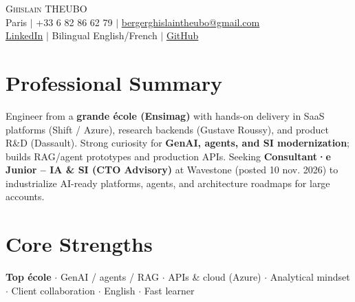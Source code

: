 \documentclass[letterpaper,10.5pt]{article}
\begin{document}
\begin{center}
{\Huge \scshape Ghislain THEUBO} \\ \vspace{2pt}
\small Paris $|$ +33 6 82 86 62 79 $|$ \href{mailto:bergerghislaintheubo@gmail.com}{bergerghislaintheubo@gmail.com} \\
\href{https://www.linkedin.com/in/berger-ghislain}{LinkedIn} $|$ Bilingual English/French $|$ \href{https://github.com/Bergerghislain}{GitHub}
\end{center}
\vspace{-6pt}
\section{Professional Summary}
\small{Engineer from a \textbf{grande \'ecole (Ensimag)} with hands-on delivery in SaaS platforms (Shift / Azure), research backends (Gustave Roussy), and product R\&D (Dassault). Strong curiosity for \textbf{GenAI, agents, and SI modernization}; builds RAG/agent prototypes and production APIs. Seeking \textbf{Consultant·e Junior -- IA \& SI (CTO Advisory)} at Wavestone (posted 10 nov. 2026) to industrialize AI-ready platforms, agents, and architecture roadmaps for large accounts.}
\section{Core Strengths}
\small{\textbf{Top \'ecole} $\cdot$ GenAI / agents / RAG $\cdot$ APIs \& cloud (Azure) $\cdot$ Analytical mindset $\cdot$ Client collaboration $\cdot$ English $\cdot$ Fast learner}
\end{document}

